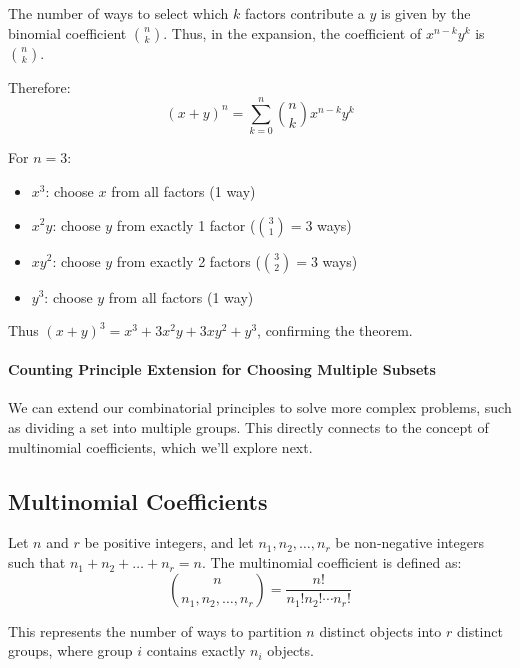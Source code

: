 The number of ways to select which $k$ factors contribute a $y$ is given by the binomial coefficient $\binom{n}{k}$. Thus, in the expansion, the coefficient of $x^{n-k}y^k$ is $\binom{n}{k}$.

Therefore:
\[
(x+y)^n = \sum_{k=0}^{n} \binom{n}{k}x^{n-k}y^k
\]

\begin{example}
For $n=3$:
\begin{itemize}[leftmargin=1.25em]
    \item $x^3$: choose $x$ from all factors (1 way)
    \item $x^2y$: choose $y$ from exactly 1 factor ($\binom{3}{1}=3$ ways)
    \item $xy^2$: choose $y$ from exactly 2 factors ($\binom{3}{2}=3$ ways)
    \item $y^3$: choose $y$ from all factors (1 way)
\end{itemize}

Thus $(x+y)^3 = x^3 + 3x^2y + 3xy^2 + y^3$, confirming the theorem.
\end{example}

\paragraph{Counting Principle Extension for Choosing Multiple Subsets}
We can extend our combinatorial principles to solve more complex problems, such as dividing a set into multiple groups. This directly connects to the concept of multinomial coefficients, which we'll explore next.

\subsection{Multinomial Coefficients}
\begin{definitionbox}[title=Multinomial Coefficient]
    Let $n$ and $r$ be positive integers, and let $n_1, n_2, \ldots, n_r$ be non-negative integers such that $n_1 + n_2 + \ldots + n_r = n$. The multinomial coefficient is defined as:
    \[
    \binom{n}{n_1, n_2, \ldots, n_r} = \frac{n!}{n_1! n_2! \cdots n_r!}
    \]
    
    This represents the number of ways to partition $n$ distinct objects into $r$ distinct groups, where group $i$ contains exactly $n_i$ objects.
\end{definitionbox}

